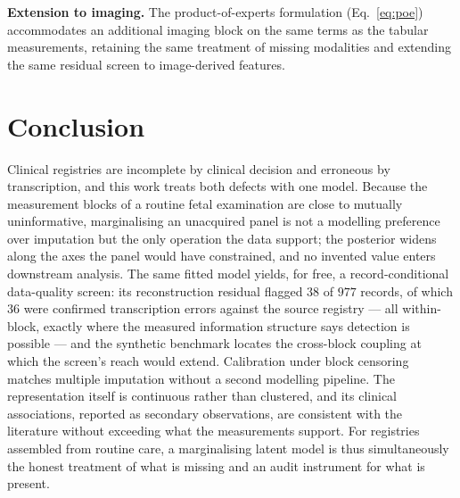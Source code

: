 \documentclass[a4paper,fleqn]{cas-sc}
\begin{document}
\noindent\textbf{Extension to imaging.}
The product-of-experts formulation (Eq.~\ref{eq:poe}) accommodates an additional imaging block on the same terms as the tabular measurements, retaining the same treatment of missing modalities and extending the same residual screen to image-derived features.
\section{Conclusion}
Clinical registries are incomplete by clinical decision and erroneous by transcription, and this work treats both defects with one model. Because the measurement blocks of a routine fetal examination are close to mutually uninformative, marginalising an unacquired panel is not a modelling preference over imputation but the only operation the data support; the posterior widens along the axes the panel would have constrained, and no invented value enters downstream analysis. The same fitted model yields, for free, a record-conditional data-quality screen: its reconstruction residual flagged $38$ of $977$ records, of which $36$ were confirmed transcription errors against the source registry --- all within-block, exactly where the measured information structure says detection is possible --- and the synthetic benchmark locates the cross-block coupling at which the screen's reach would extend. Calibration under block censoring matches multiple imputation without a second modelling pipeline. The representation itself is continuous rather than clustered, and its clinical associations, reported as secondary observations, are consistent with the literature without exceeding what the measurements support. For registries assembled from routine care, a marginalising latent model is thus simultaneously the honest treatment of what is missing and an audit instrument for what is present.
\end{document}
